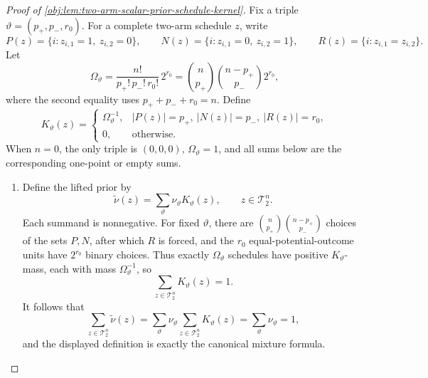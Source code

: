 \begin{proof}[Proof of \cref{obj:lem:two-arm-scalar-prior-schedule-kernel}]
Fix a triple \(\vartheta=(p_+,p_-,r_0)\).  For a complete two-arm schedule \(z\), write
\[
P(z)=\{i:z_{i,1}=1,\ z_{i,2}=0\},\qquad
N(z)=\{i:z_{i,1}=0,\ z_{i,2}=1\},\qquad
R(z)=\{i:z_{i,1}=z_{i,2}\}.
\]
Let
\[
\Omega_\vartheta
=
\frac{n!}{p_+!\,p_-!\,r_0!}\,2^{r_0}
=
\binom n{p_+}\binom{n-p_+}{p_-}2^{r_0},
\]
where the second equality uses \(p_++p_-+r_0=n\).  Define
\[
K_\vartheta(z)
=
\begin{cases}
\Omega_\vartheta^{-1},
& |P(z)|=p_+,\ |N(z)|=p_-,\ |R(z)|=r_0,\\
0,&\text{otherwise.}
\end{cases}
\]
When \(n=0\), the only triple is \((0,0,0)\), \(\Omega_\vartheta=1\), and all sums below are the corresponding one-point or empty sums.

\begin{enumerate}
\item Define the lifted prior by
\[
\widetilde\nu(z)=\sum_{\vartheta}\nu_\vartheta K_\vartheta(z),
\qquad z\in\mathcal T_2^n .
\]
Each summand is nonnegative.  For fixed \(\vartheta\), there are
\(\binom n{p_+}\binom{n-p_+}{p_-}\) choices of the sets \(P,N\), after which \(R\) is forced, and the \(r_0\) equal-potential-outcome units have \(2^{r_0}\) binary choices.  Thus exactly \(\Omega_\vartheta\) schedules have positive \(K_\vartheta\)-mass, each with mass \(\Omega_\vartheta^{-1}\), so
\[
\sum_{z\in\mathcal T_2^n}K_\vartheta(z)=1.
\]
It follows that
\[
\sum_{z\in\mathcal T_2^n}\widetilde\nu(z)
=
\sum_\vartheta \nu_\vartheta\sum_{z\in\mathcal T_2^n}K_\vartheta(z)
=
\sum_\vartheta \nu_\vartheta
=
1,
\]
and the displayed definition is exactly the canonical mixture formula. %


\end{enumerate}
\end{proof}

